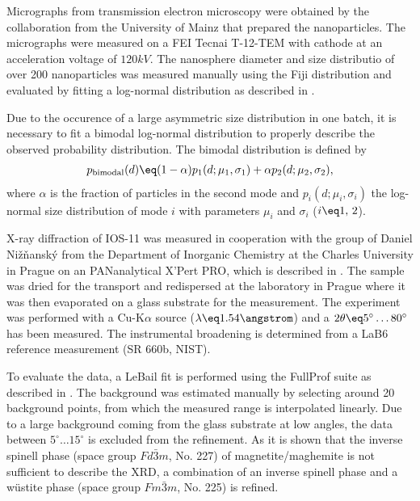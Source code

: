 \documentclass[\main/dresen_thesis.tex]{subfiles}
\begin{document}
    Micrographs from transmission electron microscopy were obtained by the collaboration from the University of Mainz that prepared the nanoparticles.
    The micrographs were measured on a FEI Tecnai T-12-TEM with  cathode at an acceleration voltage of $120 \unit{kV}$.
    The nanosphere diameter and size distributio of over 200 nanoparticles was measured manually using the Fiji distribution \cite{Schindelin_2012_Fijia} and evaluated by fitting a log-normal distribution as described in .

    Due to the occurence of a large asymmetric size distribution in one batch, it is necessary to fit a bimodal log-normal distribution to properly describe the observed probability distribution.
    The bimodal distribution is defined by
    \begin{align}
      p_\mathrm{bimodal}(d) \eq (1 - \alpha) p_1(d; \mu_1, \sigma_1) + \alpha p_2(d; \mu_2, \sigma_2),
    \end{align}
    where $\alpha$ is the fraction of particles in the second mode and $p_i(d; \mu_i, \sigma_i)$ the log-normal size distribution of mode $i$ with parameters $\mu_i$ and $\sigma_i$ ($i \eq 1,\,2$).

    X-ray diffraction of IOS-11 was measured in cooperation with the group of Daniel Nižňanský from the Department of Inorganic Chemistry at the Charles University in Prague on an PANanalytical X'Pert PRO, which is described in .
    The sample was dried for the transport and redispersed at the laboratory in Prague where it was then evaporated on a glass substrate for the measurement.
    The experiment was performed with a Cu-K$\alpha$ source ($\lambda \eq 1.54 \angstrom$) and a $2 \theta \eq 5^\circ \ldots 80^\circ$ has been measured.
    The instrumental broadening is determined from a LaB6 reference measurement (SR 660b, NIST).

    To evaluate the data, a LeBail fit is performed using the FullProf suite \cite{Rodriguez_1993_Recen} as described in .
    The background was estimated manually by selecting around 20 background points, from which the measured range is interpolated linearly.
    Due to a large background coming from the glass substrate at low angles, the data between $5 ^\circ \ldots 15 ^\circ$ is excluded from the refinement.
    As it is shown that the inverse spinell phase (space group $Fd\bar{3}m$, No. 227) of magnetite/maghemite is not sufficient to describe the XRD, a combination of an inverse spinell phase and a w\"ustite phase (space group $Fm\bar{3}m$, No. 225) is refined.
\end{document}
